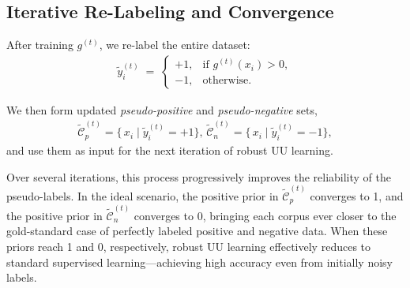 \subsection{Iterative Re-Labeling and Convergence}
\label{sec:iterative_refinement}
After training $g^{(t)}$, we re-label the entire dataset:
\begin{align*}
\tilde{y}_i^{(t)} \;=\;
\begin{cases}
+1, & \text{if } g^{(t)}(x_i) > 0,\\
-1, & \text{otherwise}.
\end{cases}    
\end{align*}

We then form updated \emph{pseudo-positive} and \emph{pseudo-negative} sets,
\begin{align*}
\widetilde{\mathcal{C}}_{p}^{(t)} = \{\,x_i \mid \tilde{y}_i^{(t)} = +1\}
\text{, }
\widetilde{\mathcal{C}}_{n}^{(t)} = \{\,x_i \mid \tilde{y}_i^{(t)} = -1\},
\end{align*}
and use them as input for the next iteration of robust UU learning.

Over several iterations, this process progressively improves the reliability of the pseudo-labels. In the ideal scenario, the positive prior in $\widetilde{\mathcal{C}}_{p}^{(t)}$ converges to 1, and the positive prior in $\widetilde{\mathcal{C}}_{n}^{(t)}$ converges to 0, bringing each corpus ever closer to the gold-standard case of perfectly labeled positive and negative data. When these priors reach 1 and 0, respectively, robust UU learning effectively reduces to standard supervised learning—achieving high accuracy even from initially noisy labels.





